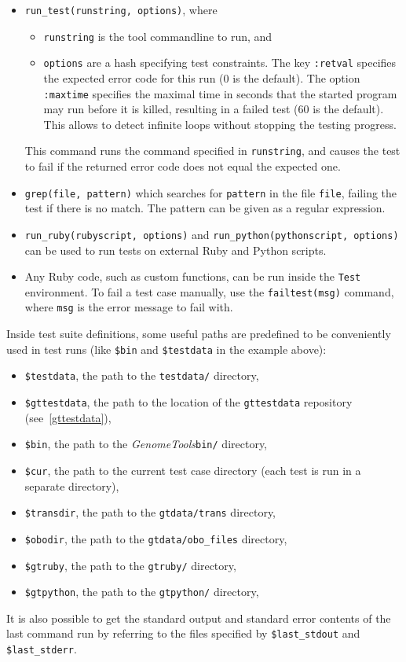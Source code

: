 \documentclass[11pt,final]{article}
\newcommand{\keyword}[1]{\lstinline{#1}}
\newcommand{\Gt}[0]{\emph{GenomeTools}\xspace}
\begin{document}
\begin{itemize}
\item
\keyword{run_test(runstring, options)}, where
\begin{itemize}
\item
\keyword{runstring} is the tool commandline to run, and
\item
\keyword{options} are a hash specifying test constraints.
The key \keyword{:retval} specifies the expected error code for this run (0 is
the
default). The option \keyword{:maxtime} specifies the maximal time in seconds that the
started program may run before it is killed, resulting in a failed test (60 is
the default). This allows to detect infinite loops without stopping the testing progress.
\end{itemize}
This command runs the command specified in \keyword{runstring}, and causes the
test to fail if the returned error code does not equal the expected one.
\item
\keyword{grep(file, pattern)} which searches for \keyword{pattern} in the
file \keyword{file}, failing the test if there is no match. The pattern can be
given as a regular expression.
\item
\keyword{run_ruby(rubyscript, options)} and
\keyword{run_python(pythonscript, options)} can be used to run tests on
external Ruby and Python scripts.
\item
Any Ruby code, such as custom functions, can be run inside the \keyword{Test}
environment. To fail a test case manually, use the \keyword{failtest(msg)}
command, where \keyword{msg} is the error message to fail with.
\end{itemize}
Inside test suite definitions, some useful paths are predefined to be
conveniently used in test runs (like \keyword{$bin} and \keyword{$testdata} in
the example above):
\begin{itemize}
\item
\keyword{$testdata}, the path to the \keyword{testdata/} directory,
\item
\keyword{$gttestdata}, the path to the location of the \keyword{gttestdata}
repository (see~\ref{gttestdata}),
\item
\keyword{$bin}, the path to the \Gt \keyword{bin/} directory,
\item
\keyword{$cur}, the path to the current test case directory (each test is run in
a separate directory),
\item
\keyword{$transdir}, the path to the \keyword{gtdata/trans} directory,
\item
\keyword{$obodir}, the path to the \keyword{gtdata/obo_files} directory,
\item
\keyword{$gtruby}, the path to the \keyword{gtruby/} directory,
\item
\keyword{$gtpython}, the path to the \keyword{gtpython/} directory,
\end{itemize}
It is also possible to get the standard output and standard error contents of
the last command run by referring to the files specified by
\keyword{$last_stdout} and \keyword{$last_stderr}.
\end{document}
